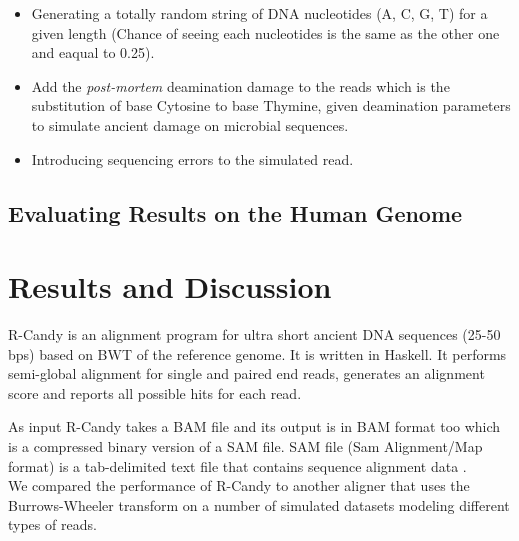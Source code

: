 \documentclass[11pt,a4paper]{report}
\begin{document}
\begin{itemize}

 \item Generating a totally random string of DNA nucleotides (A, C, G, T) for a 
given length (Chance of seeing each nucleotides is the same as the other one and 
eaqual to 0.25).

 \item Add the \emph{post-mortem} deamination damage to the reads which is the 
substitution of base Cytosine to base Thymine, given deamination parameters 
to simulate ancient damage on microbial sequences.


 \item Introducing sequencing errors to the simulated read.

\end{itemize}



\subsection{Evaluating Results on the Human Genome} \label{Evaluating Results on the Human Genome}



\section{Results and Discussion} \label{Results and Discussion}

R-Candy is an alignment program for ultra short ancient DNA sequences 
(25-50 bps) based on BWT of the reference genome. It is  written in Haskell. 
It performs semi-global alignment for single and paired end reads, 
generates an alignment score and reports all possible hits for each read.

As input R-Candy takes a BAM file and its output is in BAM format
too which is a compressed binary version of a SAM file. 
SAM file (Sam Alignment/Map format) is a tab-delimited text file 
that contains sequence alignment data \cite{SamSpecification}.   
\\
We compared the performance of R-Candy to another aligner that 
uses the Burrows-Wheeler transform\cite{bwa} on a number of simulated 
datasets modeling different types of reads. \\
\end{document}
